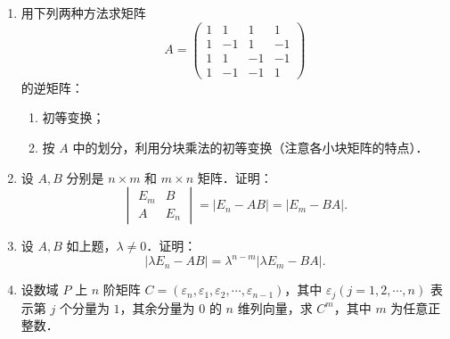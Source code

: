 \begin{enumerate}
  \[
    \text{秩}(A^*)=
    \begin{cases}
      n,&\text{秩}(A)=n,\\
      1,&\text{秩}(A)=n-1,\\
      0,&\text{秩}(A)<n-1.
    \end{cases}
  \]
  \ansproof
  \item 用下列两种方法求矩阵
  \[
    A=\begin{pmatrix}
      1&1&1&1\\
      1&-1&1&-1\\
      1&1&-1&-1\\
      1&-1&-1&1
    \end{pmatrix}
  \]
  的逆矩阵：
  \begin{enumerate}
    \item 初等变换；
  \anssub
    \item 按 $A$ 中的划分，利用分块乘法的初等变换（注意各小块矩阵的特点）．
  \anssub
  \end{enumerate}
  \item 设 $A,B$ 分别是 $n\times m$ 和 $m\times n$ 矩阵．证明：
  \[
    \begin{vmatrix}E_m&B\\A&E_n\end{vmatrix}=|E_n-AB|=|E_m-BA|.
  \]
  \ansproof
  \item 设 $A,B$ 如上题，$\lambda\neq0$．证明：
  \[
    |\lambda E_n-AB|=\lambda^{n-m}|\lambda E_m-BA|.
  \]
  \ansproof
  \item 设数域 $P$ 上 $n$ 阶矩阵 $C=(\varepsilon_n,\varepsilon_1,\varepsilon_2,\cdots,\varepsilon_{n-1})$，其中 $\varepsilon_j(j=1,2,\cdots,n)$ 表示第 $j$ 个分量为 $1$，其余分量为 $0$ 的 $n$ 维列向量，求 $C^m$，其中 $m$ 为任意正整数．
  \anscompute
\end{enumerate}

